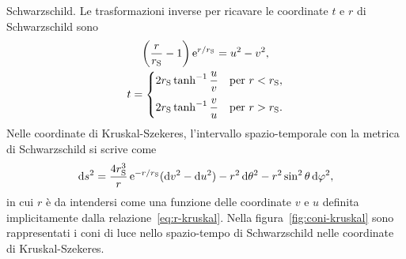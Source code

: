 Schwarzschild.  Le trasformazioni inverse per ricavare le coordinate \(t\) e
\(r\) di Schwarzschild sono
\begin{subequations}
  \allowdisplaybreaks{}
  \begin{gather}
    \label{eq:r-kruskal}
    \biggl(\frac{r}{r_{\textup{S}}} - 1\biggr)\e^{r/r_{\textup{S}}} = u^{2} -
                                                                      v^{2}, \\
    t =
        \begin{cases}
          2r_{\textup{S}}\tanh^{-1}\dfrac{u}{v} & \text{per \(r <
            r_{\textup{S}}\)}, \\[2.1ex]
          2r_{\textup{S}}\tanh^{-1}\dfrac{v}{u} & \text{per \(r >
            r_{\textup{S}}\)}.
        \end{cases}
  \end{gather}
\end{subequations}
Nelle coordinate di Kruskal-Szekeres, l'intervallo spazio-temporale con la
metrica di Schwarzschild si scrive come
\begin{equation}
  \mathop{}\!\mathrm{d} s^{2} = \frac{4r_{\textup{S}}^{3}}{r}\operatorname{\mathrm{e}}^{-r/r_{\textup{S}}}(\mathop{}\!\mathrm{d} v^{2} -
  \mathop{}\!\mathrm{d} u^{2}) - r^{2}\mathop{}\!\mathrm{d}\theta^{2} - r^{2}\sin^{2}\theta\mathop{}\!\mathrm{d}\varphi^{2},
\end{equation}
in cui \(r\) è da intendersi come una funzione delle coordinate \(v\) e \(u\)
definita implicitamente dalla relazione~\eqref{eq:r-kruskal}.  Nella
figura~\ref{fig:coni-kruskal} sono rappresentati i coni di luce nello
spazio-tempo di Schwarzschild nelle coordinate di Kruskal-Szekeres.

